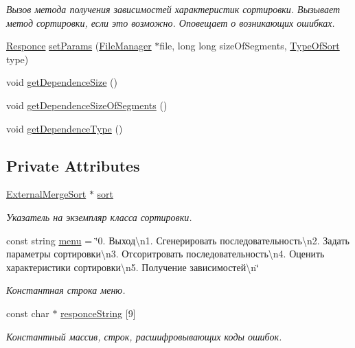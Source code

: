 \begin{DoxyCompactItemize}
\begin{DoxyCompactList}\small\item\em Вызов метода получения зависимостей характеристик сортировки. Вызывает метод сортировки, если это возможно. Оповещает о возникающих ошибках. \end{DoxyCompactList}\item 
\hyperlink{_structures_8h_a9864d6ef28dd6e38416afac4426b3491}{Responce} \hyperlink{class_user_interface_a595a469d83a351719c75c65fbf4a6fbe}{set\+Params} (\hyperlink{class_file_manager}{File\+Manager} $\ast$file, long long size\+Of\+Segments, \hyperlink{_structures_8h_adbb15722785daaf5166f7ea34323854c}{Type\+Of\+Sort} type)
\item 
void \hyperlink{class_user_interface_af7c9d93ec693f70dcfbdd9e6a080abc7}{get\+Dependence\+Size} ()
\item 
void \hyperlink{class_user_interface_aaac8a635efdb79276275f9d1ea265cd7}{get\+Dependence\+Size\+Of\+Segments} ()
\item 
void \hyperlink{class_user_interface_ab726cdce7e7518aae70cf42594139589}{get\+Dependence\+Type} ()
\end{DoxyCompactItemize}
\subsection*{Private Attributes}
\begin{DoxyCompactItemize}
\item 
\hyperlink{class_external_merge_sort}{External\+Merge\+Sort} $\ast$ \hyperlink{class_user_interface_af3405ffdb7e2834c2cf63662b5415a91}{sort}
\begin{DoxyCompactList}\small\item\em Указатель на экземпляр класса сортировки. \end{DoxyCompactList}\item 
const string \hyperlink{class_user_interface_a24b9a8a0a253382b0737a86f7ecf7d8b}{menu} = \char`\"{}0. Выход\textbackslash{}n1. Сгенерировать последовательность\textbackslash{}n2. Задать параметры сортировки\textbackslash{}n3. Отсоритровать последовательность\textbackslash{}n4. Оценить характеристики сортировки\textbackslash{}n5. Получение зависимостей\textbackslash{}n\char`\"{}
\begin{DoxyCompactList}\small\item\em Константная строка меню. \end{DoxyCompactList}\item 
const char $\ast$ \hyperlink{class_user_interface_a3ec4a2871150fd6b83ddf9d459aa0afc}{responce\+String} \mbox{[}9\mbox{]}
\begin{DoxyCompactList}\small\item\em Константный массив, строк, расшифровывающих коды ошибок. \end{DoxyCompactList}\end{DoxyCompactItemize}


